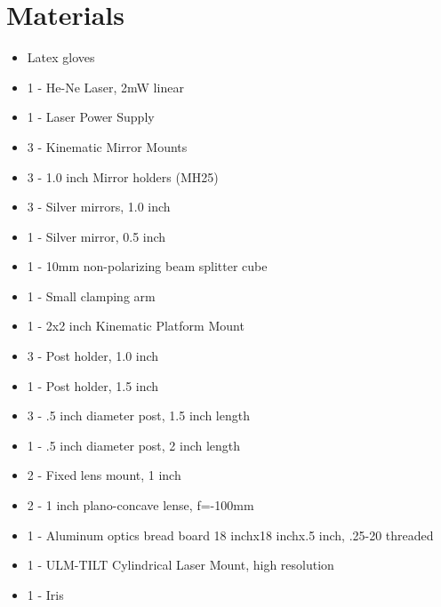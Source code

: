 \section{Materials}

\begin{itemize} \itemsep1pt \parskip0pt 
  \item Latex gloves
  \item 1 - He-Ne Laser, 2mW linear
  \item 1 - Laser Power Supply
  \item 3 - Kinematic Mirror Mounts
  \item 3 - 1.0 inch Mirror holders (MH25)
  \item 3 - Silver mirrors, 1.0 inch
  \item 1 - Silver mirror, 0.5 inch
  \item 1 - 10mm non-polarizing beam splitter cube
  \item 1 - Small clamping arm
  \item 1 - 2x2 inch Kinematic Platform Mount
  \item 3 - Post holder, 1.0 inch
  \item 1 - Post holder, 1.5 inch
  \item 3 - .5 inch diameter post, 1.5 inch length
  \item 1 - .5 inch diameter post, 2 inch length
  \item 2 - Fixed lens mount, 1 inch
  \item 2 - 1 inch plano-concave lense, f=-100mm
  \item 1 - Aluminum optics bread board 18 inchx18 inchx.5 inch, .25-20 threaded
  \item 1 - ULM-TILT Cylindrical Laser Mount, high resolution
  \item 1 - Iris
\end{itemize}

        
        
        
        
        
        
        
        
        
        
        
        
        
